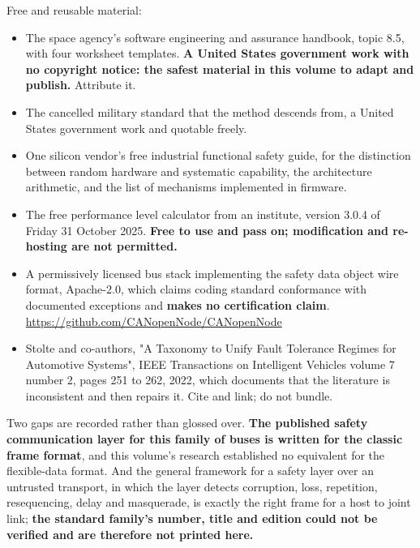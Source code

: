 Free and reusable material:
\begin{itemize}
\item The space agency's software engineering and assurance handbook, topic 8.5,
with four worksheet templates. \textbf{A United States government work with no
copyright notice: the safest material in this volume to adapt and publish.}
Attribute it.
\item The cancelled military standard that the method descends from, a United
States government work and quotable freely.
\item One silicon vendor's free industrial functional safety guide, for the
distinction between random hardware and systematic capability, the architecture
arithmetic, and the list of mechanisms implemented in firmware.
\item The free performance level calculator from an institute, version 3.0.4 of
Friday 31 October 2025. \textbf{Free to use and pass on; modification and
re-hosting are not permitted.}
\item A permissively licensed bus stack implementing the safety data object wire
format, Apache-2.0, which claims coding standard conformance with documented
exceptions and \textbf{makes no certification claim}.\newline
\url{https://github.com/CANopenNode/CANopenNode}
\item Stolte and co-authors, "A Taxonomy to Unify Fault Tolerance Regimes for
Automotive Systems", IEEE Transactions on Intelligent Vehicles volume 7 number
2, pages 251 to 262, 2022, which documents that the literature is inconsistent
and then repairs it. Cite and link; do not bundle.
\end{itemize}

Two gaps are recorded rather than glossed over. \textbf{The published safety
communication layer for this family of buses is written for the classic frame
format}, and this volume's research established no equivalent for the
flexible-data format. And the general framework for a safety layer over an
untrusted transport, in which the layer detects corruption, loss, repetition,
resequencing, delay and masquerade, is exactly the right frame for a host to
joint link; \textbf{the standard family's number, title and edition could not be
verified and are therefore not printed here.}
